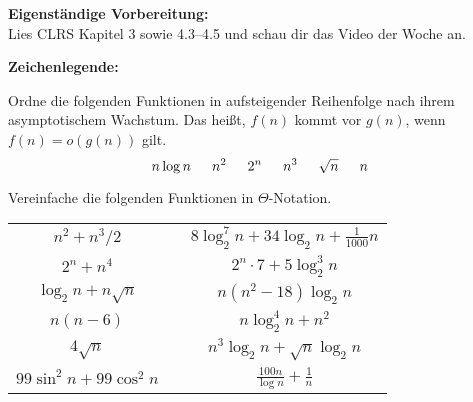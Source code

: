 \documentclass{uebung_cs}
\begin{document}
\textbf{Eigenständige Vorbereitung:}\\
Lies  CLRS Kapitel 3 sowie 4.3--4.5 und schau dir das  Video der Woche an.

\textbf{Zeichenlegende:}
\legende{}



\begin{aufgabe}\label{tue-first}\mbox{}
	Ordne die folgenden Funktionen in aufsteigender Reihenfolge nach ihrem asymptotischem Wachstum.
	Das heißt, $f(n)$ kommt vor $g(n)$, wenn $f(n) = o(g(n))$ gilt.
	\[n \log n\hspace*{15pt} n^2\hspace*{15pt} 2^n\hspace*{15pt} n^3\hspace*{15pt} \sqrt{n}\hspace*{15pt} n\]
\end{aufgabe}

\begin{aufgabe}
	Vereinfache die folgenden Funktionen in $\Theta$-Notation.
	\begin{center}
		\begin{tabular}{ccc}
			$n^2 + n^3/2$
			&&
			$8\log_2^7 n + 34\log_2 n + \frac{1}{1000}n$\\
			$2^n + n^4$&&
			$2^n\cdot 7 + 5\log_2^3 n$\\
			$\log_2n + n\sqrt{n}$&&
			$n(n^2 - 18)\log_2 n$\\
			$n(n-6)$&&
			$n\log_2^4 n + n^2$\\
			$4\sqrt{n}$&&
			$n^3 \log_2 n + \sqrt{n}\log_2 n$\\
			$99\sin^2 n + 99\cos^2 n$&& $\frac{100n}{\log n}+\frac{1}{n}$
		\end{tabular}
	\end{center}
\end{aufgabe}
\end{document}
